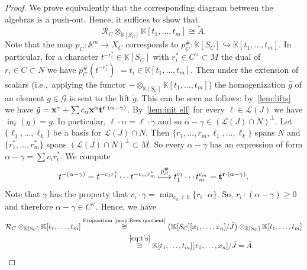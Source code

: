 \documentclass[10pt,a4paper]{amsart}
\newcommand{\thref}[1]{\ref{#1}}
\numberwithin{equation}{section}
\DeclareMathOperator{\init}{in}
\begin{document}
\begin{proof}
We prove equivalently that the corresponding diagram between the algebras is a push-out.
Hence, it suffices to show that
\begin{equation*}%
\mathcal R_C\otimes_{\mathbb K[S_C]} \mathbb K[t_1,\dots,t_m]\cong \tilde A.
\end{equation*}
Note that the map $p_C\colon \mathbb A^m \to X_C$ corresponds to $p_C^\#\colon \mathbb K[S_C] {\hookrightarrow} \mathbb K[t_1,\dots,t_m]$.
In particular, for a character $t^{-r_i^*}\in \mathbb K[S_C]$ with $r_i^*\in C^\vee\subset M$ the dual of $r_i\in C\subset N$ we have $p_C^\#(t^{-r_i^*})$ $=t_i\in \mathbb K[t_1,\dots,t_m]$.
Then under the extension of scalars (i.e.,~applying the functor $-\otimes_{\mathbb K[S_C]}\mathbb K[t_1,\dots,t_m]$) the homogenization $\hat g$ of an element $g\in \mathcal G$ is sent to the lift $\tilde g$.
This can be seen as follows:
by~\thref{lem:lifts} we have
$\tilde g={\bf x}^\gamma + \sum c_\alpha{\bf x}^\alpha{\bf t}^{{\bf r}\cdot(\alpha-\gamma)}$.
By~\thref{lem:init ell} for every $\ell\in \mathcal L(J)$ we have $\init_{\ell}(g)=g$.
In particular, $\ell\cdot \alpha=\ell\cdot \gamma$ and so $\alpha-\gamma\in (\mathcal L(J)\cap N)^\perp$.
Let $\{\ell_1,\dots,\ell_{k}\}$ be a basis for $\mathcal L(J)\cap N$.
Then $\{r_1,\dots,r_m,\ell_1,\dots,\ell_{k}\}$ spans $N$ and $\{r_1^*,\dots,r_m^*\}$ spans $(\mathcal L(J)\cap N)^\perp\subset M$.
So every $\alpha-\gamma$ has an expression of form $\alpha-\gamma=\sum c_ir_i^*$.
We compute
\begin{equation}\label{eq:t's}
t^{-(\alpha-\gamma)}=t^{-c_1r_1^*}\cdots t^{-c_mr_m^*} \overset{p_C^\#}{\longmapsto} t_1^{c_1}\cdots t_m^{c_m}={\bf t}^{{\bf r}\cdot(\alpha-\gamma)}.
\end{equation}
Note that $\gamma$ has the property that $r_i\cdot\gamma
=\min_{c_\alpha \not=0}\{r_i\cdot\alpha\}$.
So, $r_i\cdot(\alpha-\gamma)\ge 0$ and therefore $\alpha-\gamma\in C^\vee$.
Hence, we have
\begin{gather*}
\mathcal R_C\otimes_{\mathbb K[S_C]} \mathbb K[t_1,\dots,t_m]
\overset{\text{{Proposition}~\ref{prop:Rees quotient}}}{\cong}
\big(\mathbb K[S_C][x_1,\dots,x_n]/\hat J \big)\otimes_{\mathbb K[S_C]} \mathbb K[t_1,\dots,t_m]
\\ \hphantom{\mathcal R_C\otimes_{\mathbb K[S_C]} \mathbb K[t_1,\dots,t_m]Pro}
{}\overset{\eqref{eq:t's}}{\cong}
\mathbb K[t_1,\dots,t_m][x_1,\dots,x_n]/\tilde J=\tilde A.
\tag*{\qed}
\end{gather*}
\renewcommand{\qed}{}
\end{proof}
\end{document}
